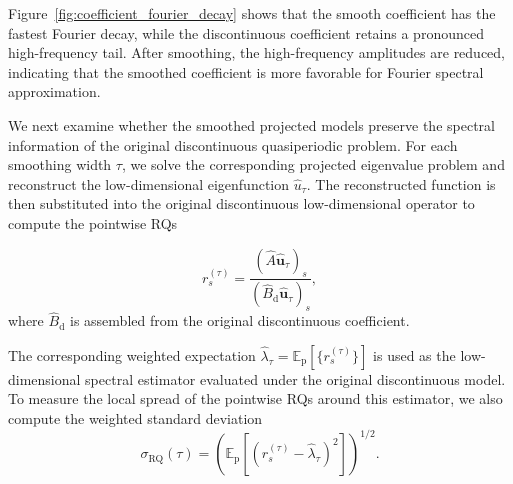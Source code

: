 \documentclass[11pt]{article}
\numberwithin{equation}{section}
\begin{document}
Figure~\ref{fig:coefficient_fourier_decay} shows that the smooth coefficient has the fastest Fourier decay, while the discontinuous coefficient retains a pronounced high-frequency tail. After smoothing, the high-frequency amplitudes are reduced, indicating that the smoothed coefficient is more favorable for Fourier spectral approximation.


We next examine whether the smoothed projected models preserve the spectral information of the original discontinuous quasiperiodic problem. For each smoothing width $\tau$, we solve the corresponding projected eigenvalue problem and reconstruct the low-dimensional eigenfunction $\widehat u_\tau$. The reconstructed function is then substituted into the original discontinuous low-dimensional operator to compute the pointwise RQs

\begin{equation}
r_s^{(\tau)} =
\frac{
(\widehat A\widehat{\mathbf u}_\tau)_s
}{
(\widehat B_{\mathrm d}\widehat{\mathbf u}_\tau)_s
},
\label{eq:smoothed_validation_rq}
\end{equation}
where $\widehat B_{\mathrm d}$ is assembled from the original discontinuous
coefficient.

The corresponding weighted expectation
$ \widehat{\lambda}_{\tau} = \mathbb E_{\mathrm p} \left[ \{r_s^{(\tau)}\} \right]$
is used as the low-dimensional spectral estimator evaluated under the original discontinuous model. To measure the local spread of the pointwise RQs around this estimator, we also compute the weighted standard deviation
\begin{equation}
\sigma_{\mathrm{RQ}}(\tau)
= \left(
\mathbb E_{\mathrm p}
\left[
\left(
r_s^{(\tau)} - \widehat{\lambda}_{\tau}
\right)^2
\right]
\right)^{1/2}.
\label{eq:smoothed_rq_std}
\end{equation}
\end{document}
